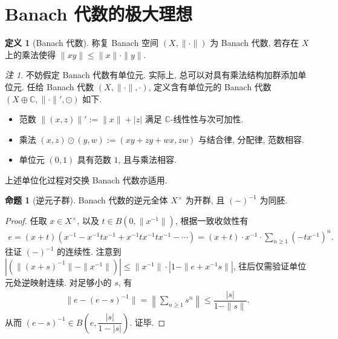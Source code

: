 \documentclass{MainStyle}
\theoremstyle{definition}
\theoremstyle{definition}
\theoremstyle{definition}
\newtheorem{definition}{定义}
\theoremstyle{definition}
\newtheorem{proposition}{命题}
\theoremstyle{definition}
\theoremstyle{definition}
\theoremstyle{definition}
\theoremstyle{remark}
\newtheorem{remark}{注}
\theoremstyle{remark}
\begin{document}
\maketitle
\tableofcontents


\section{Banach 代数的极大理想}

\begin{definition}[Banach 代数]
    称复 Banach 空间 $(X,\|\cdot\|)$ 为 Banach 代数, 若存在 $X$ 上的乘法使得 $\|xy\|\leq \|x\|\cdot \|y\|$.
\end{definition}

\begin{remark}
    不妨假定 Banach 代数有单位元. 实际上, 总可以对具有乘法结构加群添加单位元. 任给 Banach 代数 $(X,\|\cdot\|,\cdot)$, 定义含有单位元的 Banach 代数 $(X\oplus \mathbb C, \| \cdot \|',\odot)$ 如下.
    \begin{itemize}
        \item 范数 $\|(x,z)\|':=\|x\|+|z|$ 满足 $\mathbb C$-线性性与次可加性.
        \item 乘法 $(x,z)\odot(y,w):=(xy+zy+wx,zw)$ 与结合律, 分配律, 范数相容.
        \item 单位元 $(0,1)$ 具有范数 $1$, 且与乘法相容.
    \end{itemize}
    上述单位化过程对交换 Banach 代数亦适用.
\end{remark}

\begin{proposition}[逆元子群]
    Banach 代数的逆元全体 $X^\times$ 为开群, 且 $(-)^{-1}$ 为同胚.
    \begin{proof}
        任取 $x\in X^\times$, 以及 $t\in B(0,\|x^{-1}\|)$, 根据一致收敛性有
        \begin{align*}
            e=(x+t)(x^{-1}-x^{-1}tx^{-1}+x^{-1}tx^{-1}tx^{-1}-\cdots)=(x+t)\cdot x^{-1}\cdot \sum_{n\geq 1}(-tx^{-1})^n.
        \end{align*}
        往证 $(-)^{-1}$ 的连续性. 注意到 $\left|(\|(x+s)^{-1}\|-\|x^{-1}\|)\right|\leq\|x^{-1}\|\cdot |1-\|e+x^{-1}s\||$, 往后仅需验证单位元处逆映射连续. 对足够小的 $s$, 有
        \begin{align*}
            \|e-(e-s)^{-1}\|=\left\|\sum_{n\geq 1} s^n\right\|\leq \dfrac{|s|}{1-\|s\|}.
        \end{align*}
        从而 $(e-s)^{-1}\in B\left(e,\dfrac{|s|}{1-|s|}\right)$. 证毕.
    \end{proof}
\end{proposition}
\end{document}
